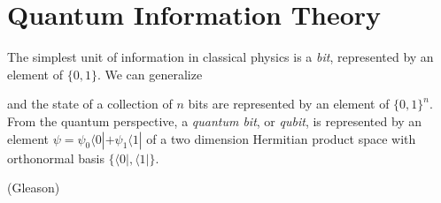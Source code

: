 \chapter{Quantum Information Theory}

The simplest unit of information in classical physics is a \emph{bit}, represented by an element of $\{ 0, 1 \}$. We can generalize 


 and the state of a collection of $n$ bits are represented by an element of $\{ 0, 1 \}^n$. From the quantum perspective, a \emph{quantum bit}, or \emph{qubit}, is represented by an element $\psi = \psi_0 \langle 0 | + \psi_1 \langle 1 |$ of a two dimension Hermitian product space with orthonormal basis $\{ \langle 0 |, \langle 1 | \}$.


(Gleason)

